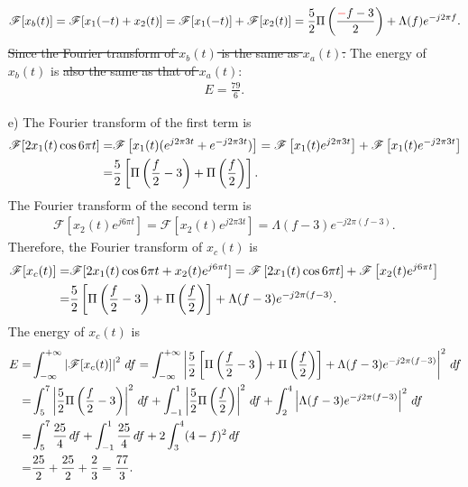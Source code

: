 \documentclass{assignment}
\begin{document}
\begin{sol}
\begin{itemize}
        \begin{align}
            \mathscr{F}[x_b(t)]=\mathscr{F}[x_1(-t)+x_2(t)]=\mathscr{F}[x_1(-t)]+\mathscr{F}[x_2(t)]=\frac{5}{2}\Pi\left(\frac{{\color{red}-}f-3}{2}\right)+\Lambda(f)e^{-j2\pi f}.
        \end{align}
        \sout{Since the Fourier transform of $x_b(t)$ is the same as $x_a(t)$.} The energy of $x_b(t)$ is \sout{also the same as that of $x_a(t)$}:
        \begin{align}
            E=\frac{79}{6}.
        \end{align}
        \item[e)] The Fourier transform of the first term is
        \begin{align}
            \notag\mathscr{F}[2x_1(t)\cos 6\pi t]=&\mathscr{F}\left[x_1(t)(e^{j2\pi 3t}+e^{-j2\pi 3t})\right]=\mathscr{F}\left[x_1(t)e^{j2\pi 3t}\right]+\mathscr{F}\left[x_1(t)e^{-j2\pi 3t}\right]\\
            =&\frac{5}{2}\left[\Pi\left(\frac{f}{2}-3\right)+\Pi\left(\frac{f}{2}\right)\right].
        \end{align}
        The Fourier transform of the second term is
        \begin{align}
            \mathscr{F}\left[x_2(t)e^{j6\pi t}\right]=\mathscr{F}\left[x_2(t)e^{j2\pi 3t}\right]=\Lambda(f-3)e^{-j2\pi(f-3)}.
        \end{align}
        Therefore, the Fourier transform of $x_c(t)$ is
        \begin{align}
            \notag\mathscr{F}[x_c(t)]=&\mathscr{F}[2x_1(t)\cos 6\pi t+x_2(t)e^{j6\pi t}]=\mathscr{F}\left[2x_1(t)\cos 6\pi t\right]+\mathscr{F}\left[x_2(t)e^{j6\pi t}\right]\\
            =&\frac{5}{2}\left[\Pi\left(\frac{f}{2}-3\right)+\Pi\left(\frac{f}{2}\right)\right]+\Lambda(f-3)e^{-j2\pi(f-3)}.
        \end{align}
        The energy of $x_c(t)$ is
        \begin{align}
            \notag E=&\int_{-\infty}^{+\infty}\left\lvert\mathscr{F}[x_c(t)]\right\rvert^2\,df=\int_{-\infty}^{+\infty}\left\lvert\frac{5}{2}\left[\Pi\left(\frac{f}{2}-3\right)+\Pi\left(\frac{f}{2}\right)\right]+\Lambda(f-3)e^{-j2\pi(f-3)}\right\rvert^2\,df\\
            \notag=&\int_5^7\left\lvert\frac{5}{2}\Pi\left(\frac{f}{2}-3\right)\right\rvert^2\,df+\int_{-1}^1\left\lvert\frac{5}{2}\Pi\left(\frac{f}{2}\right)\right\rvert^2\,df+\int_2^4\left\lvert\Lambda(f-3)e^{-j2\pi(f-3)}\right\rvert^2\,df\\
            \notag=&\int_5^7\frac{25}{4}\,df+\int_{-1}^1\frac{25}{4}\,df+2\int_3^4(4-f)^2\,df\\
            =&\frac{25}{2}+\frac{25}{2}+\frac{2}{3}=\frac{77}{3}.
        \end{align}
    \end{itemize}
\end{sol}
\end{document}
